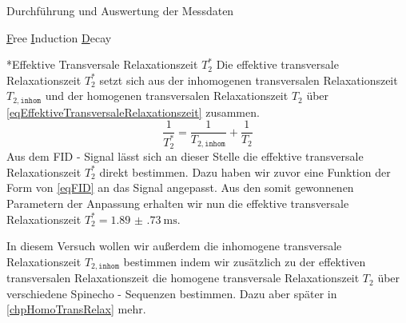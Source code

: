 \documentclass[pdftex, a4paper,11pt, twoside, ngerman]{report}
\begin{document}
\begin{chapter}{Durchführung und Auswertung der Messdaten}
\begin{section}{
        \underline{F}ree \underline{I}nduction \underline{D}ecay}

      
      \begin{subsection}*{Effektive Transversale Relaxationszeit $T_{2}^{*}$}
        \label{chpEffTransRelax}
        Die effektive transversale Relaxationszeit $T_{2}^{*}$ setzt sich
        aus der inhomogenen transversalen Relaxationszeit
        $T_{2,\mathtt{inhom}}$ und der homogenen transversalen Relaxationszeit
        $T_{2}$ über \cref{eqEffektiveTransversaleRelaxationszeit} zusammen.
        \begin{equation}
          \label{eqEffektiveTransversaleRelaxationszeit}
          \frac{1}{T_{2}^{*}}=\frac{1}{T_{2,\mathtt{inhom}}}+\frac{1}{T_{2}}
        \end{equation}
        Aus dem FID - Signal lässt sich an dieser Stelle die effektive
        transversale Relaxationszeit $T_{2}^{*}$ direkt bestimmen.
        Dazu haben wir zuvor eine Funktion der Form von \cref{eqFID} an das
        Signal angepasst.
        Aus den somit gewonnenen Parametern der Anpassung erhalten wir nun
        die effektive transversale Relaxationszeit
        $T_{2}^{*}=\SI{1.89(73)}{\milli\second}$.
        
        In diesem Versuch wollen wir außerdem die inhomogene transversale
        Relaxationszeit $T_{2,\mathtt{inhom}}$ bestimmen indem wir zusätzlich
        zu der effektiven transversalen Relaxationszeit die homogene
        transversale Relaxationszeit $T_{2}$ über verschiedene
        Spinecho - Sequenzen bestimmen.
        Dazu aber später in \cref{chpHomoTransRelax} mehr.
        
      \end{subsection}
      
    \end{section}
    
    
    

\end{chapter}
\end{document}
